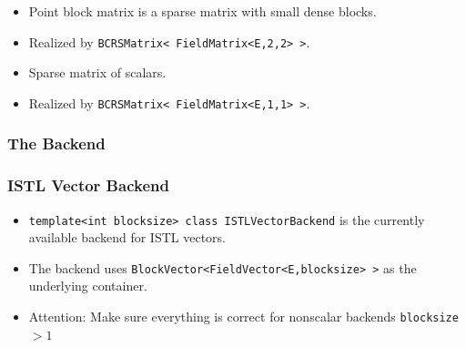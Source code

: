 {\begin{frame}[fragile]
\begin{block}{}
\begin{minipage}{0.48\textwidth}
  \begin{itemize}
  \item  Point block matrix is a sparse matrix with small dense
blocks.
\item Realized by \lstinline!BCRSMatrix< FieldMatrix<E,2,2> >!. 
  \end{itemize}
\end{minipage}
\begin{minipage}{0.48\textwidth}
  \begin{itemize}
  \item Sparse matrix of scalars.
  \item Realized by \lstinline!BCRSMatrix< FieldMatrix<E,1,1> >!.
  \end{itemize}
\end{minipage}
\end{block}
\end{frame}


\subsubsection{The Backend}
\label{sec:backend}

\begin{frame}
  \frametitle{ISTL Vector Backend}
  \begin{itemize}
  \item \lstinline!template<int blocksize> class ISTLVectorBackend!
    is the currently available backend for ISTL vectors.
  \item The backend uses
    \lstinline!BlockVector<FieldVector<E,blocksize> >! as the
    underlying container.
  \item Attention: Make sure everything is correct for nonscalar backends
    \lstinline!blocksize!$>1$
  \end{itemize}
\end{frame}

}
